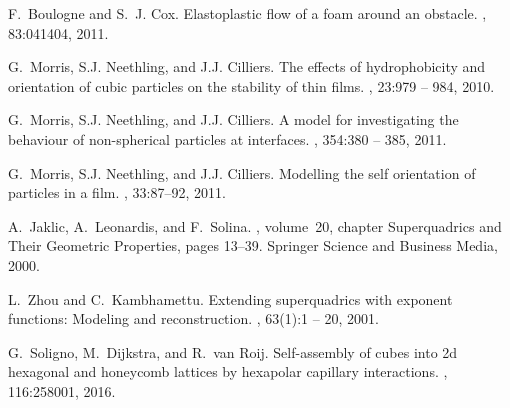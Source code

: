 \documentclass[preprint]{revtex4-1}
\begin{document}
\begin{thebibliography}{10}
F.~Boulogne and S.~J. Cox.
\newblock Elastoplastic flow of a foam around an obstacle.
, 83:041404, 2011.

G.~Morris, S.J. Neethling, and J.J. Cilliers.
\newblock The effects of hydrophobicity and orientation of cubic particles on
  the stability of thin films.
, 23:979 -- 984, 2010.

G.~Morris, S.J. Neethling, and J.J. Cilliers.
\newblock A model for investigating the behaviour of non-spherical particles at
  interfaces.
, 354:380 -- 385, 2011.

G.~Morris, S.J. Neethling, and J.J. Cilliers.
\newblock Modelling the self orientation of particles in a film.
, 33:87--92, 2011.

A.~Jaklic, A.~Leonardis, and F.~Solina.
, volume~20, chapter
  Superquadrics and Their Geometric Properties, pages 13--39.
\newblock Springer Science and Business Media, 2000.

L.~Zhou and C.~Kambhamettu.
\newblock Extending superquadrics with exponent functions: Modeling and
  reconstruction.
, 63(1):1 -- 20, 2001.

G.~Soligno, M.~Dijkstra, and R.~van Roij.
\newblock Self-assembly of cubes into 2d hexagonal and honeycomb lattices by
  hexapolar capillary interactions.
, 116:258001, 2016.

\end{thebibliography}
\end{document}
